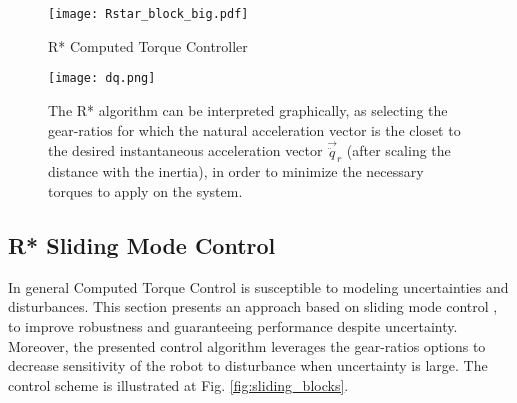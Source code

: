 \begin{figure}[t]
	\centering
		\texttt{[image: Rstar\_block\_big.pdf]}
	\caption{R* Computed Torque Controller}
	\label{fig:Rstar_block_big}
\end{figure}

\begin{figure}[htp]
	\centering
		\texttt{[image: dq.png]}
	\caption[R* algorithm graphical interpretation]{The R* algorithm can be interpreted graphically, as selecting the gear-ratios for which the natural acceleration vector is the closet to the desired instantaneous acceleration vector $\vec{\ddot{q}}_r$ (after scaling the distance with the inertia), in order to minimize the necessary torques to apply on the system.}
	\label{fig:dq}
\end{figure}

\subsection{R* Sliding Mode Control}
\label{sec:slidingmode}

In general Computed Torque Control is susceptible to modeling uncertainties and disturbances. This section presents an approach based on sliding mode control \cite{slotine_applied_1991}, to improve robustness and guaranteeing performance despite uncertainty. Moreover, the presented control algorithm leverages the gear-ratios options to decrease sensitivity of the robot to disturbance when uncertainty is large. The control scheme is illustrated at Fig. \ref{fig:sliding_blocks}.

